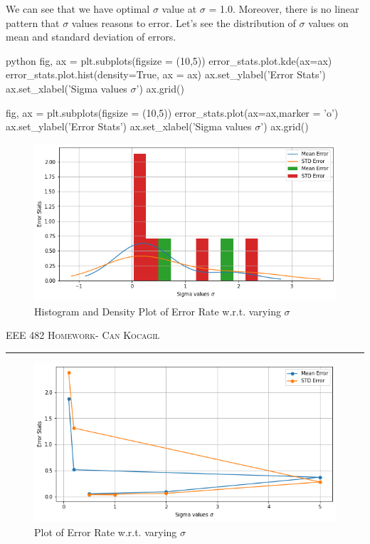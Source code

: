 \documentclass[12pt]{amsart}
\begin{document}
\newpage
We can see that we have optimal $\sigma$ value at $\sigma$ = 1.0. Moreover, there is no linear pattern that $\sigma$ values reasons to error. Let's see the distribution of $\sigma$ values on mean and standard deviation of errors.

\begin{mintedbox}{python}
fig, ax = plt.subplots(figsize = (10,5))
error_stats.plot.kde(ax=ax)
error_stats.plot.hist(density=True, ax = ax)
ax.set_ylabel('Error Stats')
ax.set_xlabel('Sigma values $\sigma$')
ax.grid()

fig, ax = plt.subplots(figsize = (10,5))
error_stats.plot(ax=ax,marker = 'o')
ax.set_ylabel('Error Stats')
ax.set_xlabel('Sigma values $\sigma$')
ax.grid()
\end{mintedbox}

\begin{figure}[h]
    \centering
        \includegraphics[width = 1\textwidth]{images/Q2/hist.png}
        \caption{Histogram and Density Plot of Error Rate w.r.t. varying $\sigma$}
\end{figure}

\newpage
{\scshape EEE 482} \hfill {\scshape \large  Homework-\relax} \hfill {\scshape Can Kocagil}
\smallskip
\hrule
\vspace{2mm}


\begin{figure}[h]
    \centering
        \includegraphics[width = 1\textwidth]{images/Q2/plot.png}
        \caption{Plot of Error Rate w.r.t. varying $\sigma$}
\end{figure}
\end{document}

